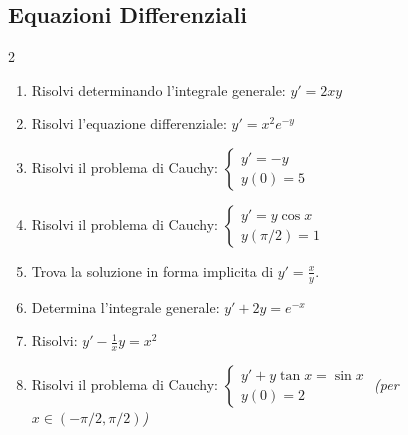 \subsection{Equazioni Differenziali}
\begin{multicols}{2}
\begin{enumerate}
    \item {} Risolvi determinando l'integrale generale: $y' = 2x y$
    \item {} Risolvi l'equazione differenziale: $y' = x^2 e^{-y}$
    \item {} Risolvi il problema di Cauchy: $\begin{cases} y' = -y \\ y(0) = 5 \end{cases}$
    \item {} Risolvi il problema di Cauchy: $\begin{cases} y' = y \cos x \\ y(\pi/2) = 1 \end{cases}$
    \item {} Trova la soluzione in forma implicita di $y' = \frac{x}{y}$.
    
    \item {} Determina l'integrale generale: $y' + 2y = e^{-x}$
    \item {} Risolvi: $y' - \frac{1}{x} y = x^2$
    \item {} Risolvi il problema di Cauchy: $\begin{cases} y' + y \tan x = \sin x \\ y(0) = 2 \end{cases}$ \textit{(per $x \in (-\pi/2, \pi/2)$)}
    

\end{enumerate}
\end{multicols}
